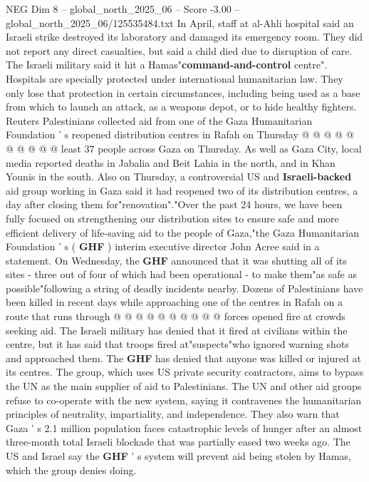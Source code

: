 \begin{textsample}{NEG Dim 8 – global\_north\_2025\_06 – Score -3.00 – global\_north\_2025\_06/125535484.txt}
In April, staff at al-Ahli hospital said an Israeli strike destroyed its laboratory and damaged its emergency room.
They did not report any direct casualties, but said a child died due to disruption of care.
The Israeli military said it hit a Hamas"\textbf{command-and-control} centre".
Hospitals are specially protected under international humanitarian law.
They only lose that protection in certain circumstances, including being used as a base from which to launch an attack, as a weapons depot, or to hide healthy fighters.
Reuters Palestinians collected aid from one of the Gaza Humanitarian Foundation ' s reopened distribution centres in Rafah on Thursday @ @ @ @ @ @ @ @ @ @ least 37 people across Gaza on Thursday.
As well as Gaza City, local media reported deaths in Jabalia and Beit Lahia in the north, and in Khan Younis in the south.
Also on Thursday, a controversial US and \textbf{Israeli-backed} aid group working in Gaza said it had reopened two of its distribution centres, a day after closing them for"renovation"."Over the past 24 hours, we have been fully focused on strengthening our distribution sites to ensure safe and more efficient delivery of life-saving aid to the people of Gaza,"the Gaza Humanitarian Foundation ' s ( \textbf{GHF} ) interim executive director John Acree said in a statement.
On Wednesday, the \textbf{GHF} announced that it was shutting all of its sites - three out of four of which had been operational - to make them"as safe as possible"following a string of deadly incidents nearby.
Dozens of Palestinians have been killed in recent days while approaching one of the centres in Rafah on a route that runs through @ @ @ @ @ @ @ @ @ @ forces opened fire at crowds seeking aid.
The Israeli military has denied that it fired at civilians within the centre, but it has said that troops fired at"suspects"who ignored warning shots and approached them.
The \textbf{GHF} has denied that anyone was killed or injured at its centres.
The group, which uses US private security contractors, aims to bypass the UN as the main supplier of aid to Palestinians.
The UN and other aid groups refuse to co-operate with the new system, saying it contravenes the humanitarian principles of neutrality, impartiality, and independence.
They also warn that Gaza ' s 2.1 million population faces catastrophic levels of hunger after an almost three-month total Israeli blockade that was partially eased two weeks ago.
The US and Israel say the \textbf{GHF} ' s system will prevent aid being stolen by Hamas, which the group denies doing.

\end{textsample}

